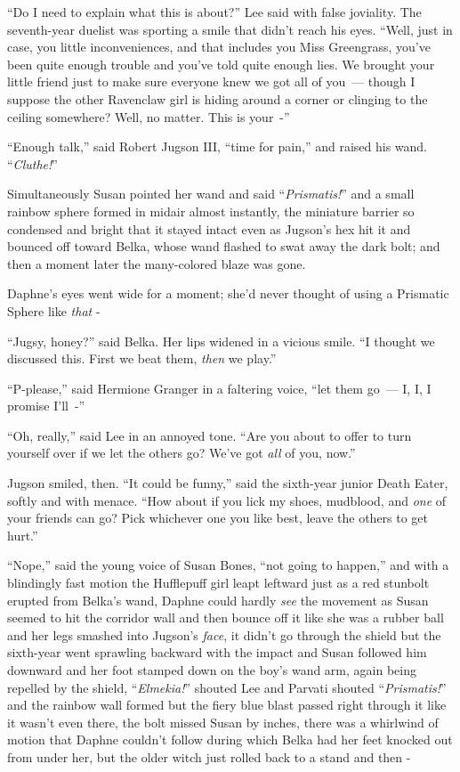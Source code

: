 ``Do I need to explain what this is about?'' Lee said with false joviality. The seventh-year duelist was sporting a smile that didn't reach his eyes. ``Well, just in case, you little inconveniences, and that includes you Miss Greengrass, you've been quite enough trouble and you've told quite enough lies. We brought your little friend just to make sure everyone knew we got all of you~--- though I suppose the other Ravenclaw girl is hiding around a corner or clinging to the ceiling somewhere? Well, no matter. This is your~-''

``Enough talk,'' said Robert Jugson III, ``time for pain,'' and raised his wand. ``\emph{Cluthe!}''

Simultaneously Susan pointed her wand and said ``\emph{Prismatis!}'' and a small rainbow sphere formed in midair almost instantly, the miniature barrier so condensed and bright that it stayed intact even as Jugson's hex hit it and bounced off toward Belka, whose wand flashed to swat away the dark bolt; and then a moment later the many-colored blaze was gone.

Daphne's eyes went wide for a moment; she'd never thought of using a Prismatic Sphere like \emph{that} -

``Jugsy, honey?'' said Belka. Her lips widened in a vicious smile. ``I thought we discussed this. First we beat them, \emph{then} we play.''

``P-please,'' said Hermione Granger in a faltering voice, ``let them go~--- I, I, I promise I'll~-''

``Oh, really,'' said Lee in an annoyed tone. ``Are you about to offer to turn yourself over if we let the others go? We've got \emph{all} of you, now.''

Jugson smiled, then. ``It could be funny,'' said the sixth-year junior Death Eater, softly and with menace. ``How about if you lick my shoes, mudblood, and \emph{one} of your friends can go? Pick whichever one you like best, leave the others to get hurt.''

``Nope,'' said the young voice of Susan Bones, ``not going to happen,'' and with a blindingly fast motion the Hufflepuff girl leapt leftward just as a red stunbolt erupted from Belka's wand, Daphne could hardly \emph{see} the movement as Susan seemed to hit the corridor wall and then bounce off it like she was a rubber ball and her legs smashed into Jugson's \emph{face}, it didn't go through the shield but the sixth-year went sprawling backward with the impact and Susan followed him downward and her foot stamped down on the boy's wand arm, again being repelled by the shield, ``\emph{Elmekia!}'' shouted Lee and Parvati shouted ``\emph{Prismatis!}'' and the rainbow wall formed but the fiery blue blast passed right through it like it wasn't even there, the bolt missed Susan by inches, there was a whirlwind of motion that Daphne couldn't follow during which Belka had her feet knocked out from under her, but the older witch just rolled back to a stand and then -

